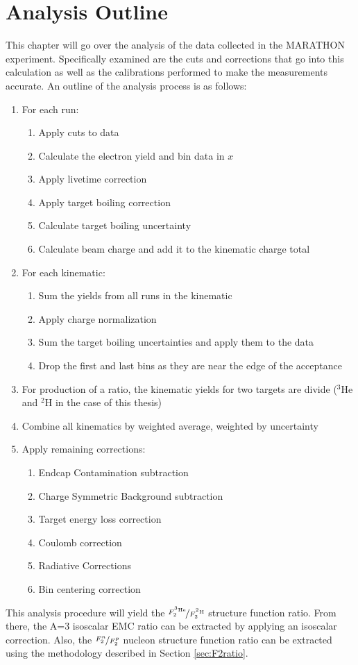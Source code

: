 \section{Analysis Outline}
\label{sec:analysis_outline}
This chapter will go over the analysis of the data collected in the MARATHON experiment. Specifically examined are the cuts and corrections that go into this calculation as well as the calibrations performed to make the measurements accurate. An outline of the analysis process is as follows:
\renewcommand{\labelenumii}{\roman{enumii}.}
\begin{enumerate}
	\item For each run:
	\begin{enumerate}
		\item Apply cuts to data
		\item Calculate the electron yield and bin data in $x$
		\item Apply livetime correction
		\item Apply target boiling correction
		\item Calculate target boiling uncertainty
		\item Calculate beam charge and add it to the kinematic charge total
	\end{enumerate}
	\item For each kinematic:
	\begin{enumerate}
		\item Sum the yields from all runs in the kinematic
		\item Apply charge normalization
		\item Sum the target boiling uncertainties and apply them to the data
		\item Drop the first and last bins as they are near the edge of the acceptance
	\end{enumerate}
	\item For production of a ratio, the kinematic yields for two targets are divide ($^3$He and $^2$H in the case of this thesis)
	\item Combine all kinematics by weighted average, weighted by uncertainty
	\item Apply remaining corrections:
	\begin{enumerate}
		\item Endcap Contamination subtraction
		\item Charge Symmetric Background subtraction
		\item Target energy loss correction
		\item Coulomb correction
		\item Radiative Corrections
		\item Bin centering correction
	\end{enumerate}
\end{enumerate}
This analysis procedure will yield the $\nicefrac{F_2^{^3\textrm{He}}}{F_2^{^2\textrm{H}}}$ structure function ratio. From there, the A=3 isoscalar EMC ratio can be extracted by applying an isoscalar correction. Also, the $\nicefrac{F_2^n}{F_2^p}$ nucleon structure function ratio can be extracted using the methodology described in Section \ref{sec:F2ratio}.

